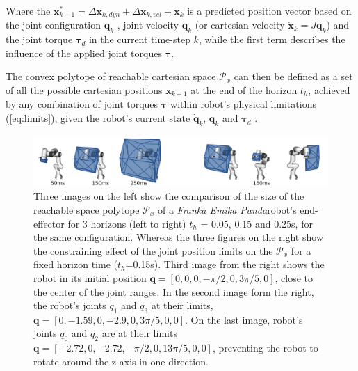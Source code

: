 Where the $\bm{x}^*_{k+1}\! =\!\Delta \bm{x}_{k,dyn}\! +\! \Delta \bm{x}_{k,vel} + \bm{x}_{k}$ is a predicted position vector based on the joint configuration $\bm{q}_k$ , joint velocity $\dot{\bm{q}}_k$ (or cartesian velocity  $\dot{\bm{x}}_k\!=\!J\dot{\bm{q}}_k$) and the joint torque $\bm{\tau}_d$ in the current time-step $k$, while the first term describes the influence of the applied joint torques $\bm{\tau}$.

The convex polytope of reachable cartesian space $\mathcal{P}_x$ can then be defined as a set of all the possible cartesian positions $\bm{x}_{k+1}$ at the end of the horizon $t_h$, achieved by any combination of joint torques $\bm{\tau}$ within robot's physical limitations (\ref{eq:limits}), given the robot's current state $\dot{\bm{q}}_k$, $\bm{q}_k$ and $\bm{\tau}_d$ .

\begin{figure}[!t]
    \centering
    \includegraphics[width=\linewidth]{Papers/images/horizon_limits.png}
    \caption{Three images on the left show the comparison of the size of the reachable space polytope $\mathcal{P}_x$ of a \textit{Franka Emika Panda}\protect\footnotemark robot's end-effector for 3 horizons  (left to right) $t_h$ = 0.05, 0.15 and 0.25s, for the same configuration. Whereas the three figures on the right show the constraining effect of the joint position limits on the $\mathcal{P}_x$ for a fixed horizon time ($t_h$=0.15s).
    Third image from the right shows the robot in its initial position $\bm{q}=[0,0,0,-\pi/2, 0, 3\pi/5,0]$, close to the center of the joint ranges. In the second image form the right, the robot's joints $q_1$ and $q_3$ at their limits, $\bm{q}=[0,-1.59,0,-2.9,0,3\pi/5,0,0]$. On the last image, robot's joints $q_0$ and $q_2$ are at their limits $\bm{q}=[-2.72,0, -2.72,-\pi/2,0,13\pi/5,0,0]$, preventing the robot to rotate around the z axis in one direction.} 
    \label{fig:horizon}
\end{figure}


